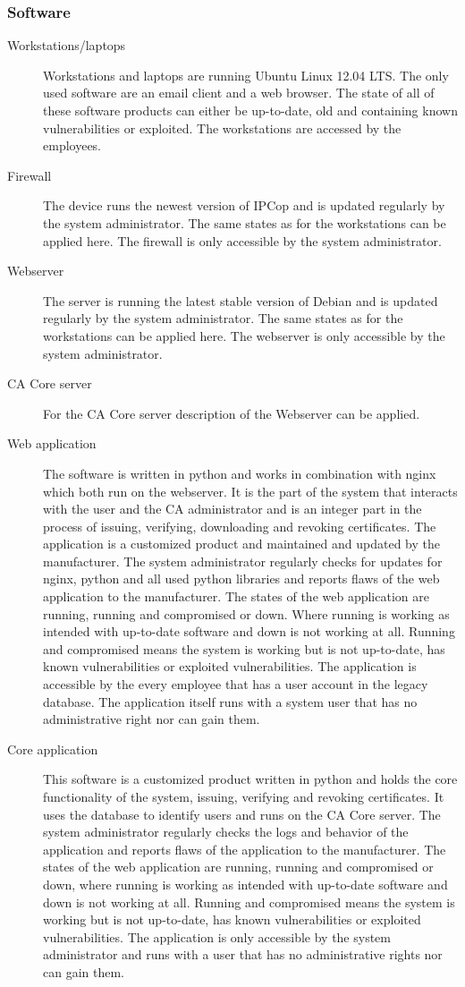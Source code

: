 \documentclass[a4paper, toc=index, 12pt, DIV14, twoside, BCOR2cm, headsepline, numbers=noenddot, bibliography=totoc]{scrbook}
\begin{document}
\subsubsection{Software}
\begin{description}
\item[Workstations/laptops ] Workstations and laptops are running Ubuntu Linux 12.04 LTS. The only used software are an email client and a web browser. The state of all of these software products can either be up-to-date, old and containing known vulnerabilities or exploited. The workstations are accessed by the employees.
\item[Firewall ] The device runs the newest version of IPCop and is updated regularly by the system administrator. The same states as for the workstations can be applied here. The firewall is only accessible by the system administrator.
\item[Webserver ] The server is running the latest stable version of Debian and is updated regularly by the system administrator. The same states as for the workstations can be applied here. The webserver is only accessible by the system administrator.
\item[CA Core server ] For the CA Core server description of the Webserver can be applied.
\item[Web application ] The software is written in python and works in combination with nginx which both run on the webserver. It is the part of the system that interacts with the user and the CA administrator and is an integer part in the process of issuing, verifying, downloading and revoking certificates. The application is a customized product and maintained and updated by the manufacturer. The system administrator regularly checks for updates for nginx, python and all used python libraries and reports flaws of the web application to the manufacturer. The states of the web application are running, running and compromised or down. Where running is working as intended with up-to-date software and down is not working at all. Running and compromised means the system is working but is not up-to-date, has known vulnerabilities or exploited vulnerabilities. The application is accessible by the every employee that has a user account in the legacy database. The application itself runs with a system user that has no administrative right nor can gain them.
\item[Core application ] This software is a customized product written in python and holds the core functionality of the system, issuing, verifying and revoking certificates. It uses the database to identify users and runs on the CA Core server. The system administrator regularly checks the logs and behavior of the application and reports flaws of the application to the manufacturer. The states of the web application are running, running and compromised or down, where running is working as intended with up-to-date software and down is not working at all. Running and compromised means the system is working but is not up-to-date, has known vulnerabilities or exploited vulnerabilities. The application is only accessible by the system administrator and runs with a user that has no administrative rights nor can gain them.

\end{description}
\end{document}
